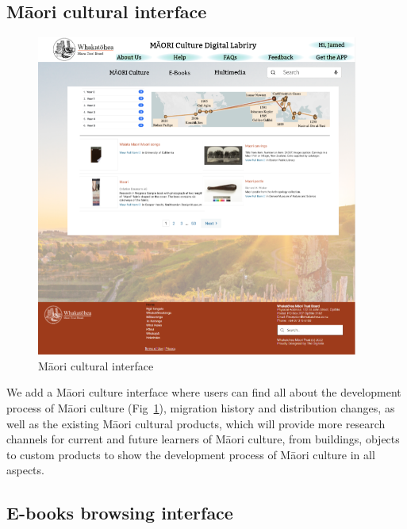 \subsection{Māori cultural interface}

\begin{figure}[htbp]
  \centerline{\includegraphics[width=300pt]{images/3-1-3.png}}
  \caption{Māori cultural interface}
  \label{fig3.1.5}
\end{figure}

We add a Māori culture interface where users can find all about the development process of Māori culture (Fig~\ref{fig3.1.5}), migration history and distribution changes, as well as the existing Māori cultural products, which will provide more research channels for current and future learners of Māori culture, from buildings, objects to custom products to show the development process of Māori culture in all aspects.

\subsection{E-books browsing interface}

